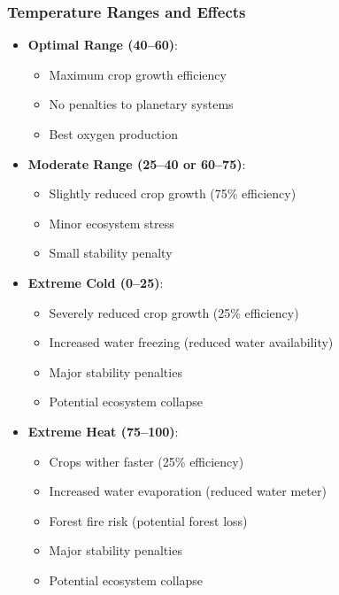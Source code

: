 \documentclass[12pt,a4paper]{article}
\begin{document}
\subsubsection{Temperature Ranges and Effects}

\begin{itemize}
    \item \textbf{Optimal Range (40--60)}:
    \begin{itemize}
        \item Maximum crop growth efficiency
        \item No penalties to planetary systems
        \item Best oxygen production
    \end{itemize}
    
    \item \textbf{Moderate Range (25--40 or 60--75)}:
    \begin{itemize}
        \item Slightly reduced crop growth (75\% efficiency)
        \item Minor ecosystem stress
        \item Small stability penalty
    \end{itemize}
    
    \item \textbf{Extreme Cold (0--25)}:
    \begin{itemize}
        \item Severely reduced crop growth (25\% efficiency)
        \item Increased water freezing (reduced water availability)
        \item Major stability penalties
        \item Potential ecosystem collapse
    \end{itemize}
    
    \item \textbf{Extreme Heat (75--100)}:
    \begin{itemize}
        \item Crops wither faster (25\% efficiency)
        \item Increased water evaporation (reduced water meter)
        \item Forest fire risk (potential forest loss)
        \item Major stability penalties
        \item Potential ecosystem collapse
    \end{itemize}
\end{itemize}
\end{document}
